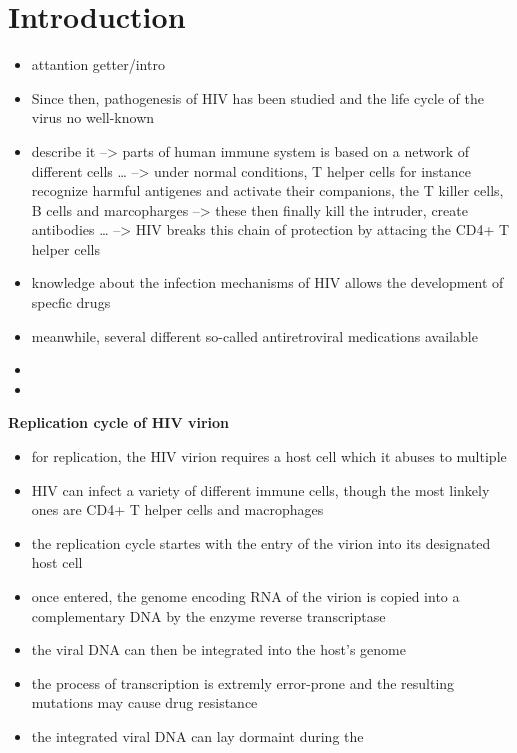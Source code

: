 \section{Introduction}
\label{sec:Introduction}

\begin{itemize}
    \item attantion getter/intro
    \item Since then, pathogenesis of HIV has been studied and the life cycle of the virus no well-known
    \item describe it 
        --> parts of human immune system is based on a network of different cells \dots
        --> under normal conditions, T helper cells for instance recognize harmful antigenes and activate their companions, 
            the T killer cells, B cells and marcopharges
        --> these then finally kill the intruder, create antibodies \dots
        --> HIV breaks this chain of protection by attacing the CD4+ T helper cells
    \item knowledge about the infection mechanisms of HIV allows the development of specfic drugs
    \item meanwhile, several different so-called antiretroviral medications available
    \item 
    \item 
\end{itemize}

\textbf{Replication cycle of HIV virion}
\begin{itemize}
    \item for replication, the HIV virion requires a host cell which it abuses to multiple
    \item HIV can infect a variety of different immune cells, though the most linkely ones are CD4+ T helper cells and macrophages
    \item the replication cycle startes with the entry of the virion  into its designated host cell
    \item once entered, the genome encoding RNA of the virion is copied into a complementary DNA by the enzyme reverse transcriptase
    \item the viral DNA can then be integrated into the host's genome
    \item the process of transcription is extremly error-prone and the resulting mutations may cause drug resistance
    \item the integrated viral DNA can lay dormaint during the 
\end{itemize}

